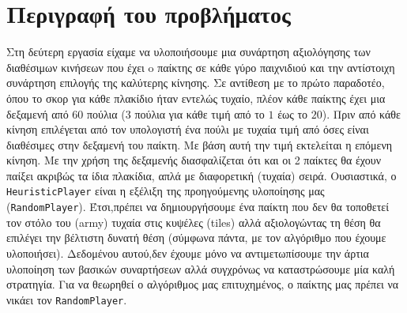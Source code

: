 \chapter{Περιγραφή του προβλήματος}
Στη δεύτερη εργασία είχαμε να υλοποιήσουμε μια συνάρτηση αξιολόγησης των διαθέσιμων
κινήσεων που έχει o παίκτης σε κάθε γύρο παιχνιδιού και την αντίστοιχη συνάρτηση 
επιλογής της καλύτερης κίνησης. 
Σε αντίθεση με το πρώτο παραδοτέο, όπου το σκορ για 
κάθε πλακίδιο ήταν εντελώς τυχαίο, πλέον κάθε παίκτης έχει μια δεξαμενή από $60$ πούλια
(3 πούλια για κάθε τιμή από το $1$ έως το $20$).
Πριν από κάθε κίνηση επιλέγεται από τον υπολογιστή ένα πούλι με τυχαία τιμή από όσες είναι διαθέσιμες στην δεξαμενή του παίκτη.
Με βάση αυτή την τιμή εκτελείται η επόμενη κίνηση.
Με την χρήση της δεξαμενής διασφαλίζεται ότι και οι 2 παίκτες θα έχουν παίξει ακριβώς τα ίδια πλακίδια, απλά με διαφορετική (τυχαία) σειρά.
Ουσιαστικά, ο \lstinline!HeuristicPlayer! είναι η εξέλιξη της 
προηγούμενης υλοποίησης μας (\lstinline!RandomPlayer!).
Έτσι,πρέπει να δημιουργήσουμε ένα παίκτη που δεν θα τοποθετεί τον στόλο του (army) τυχαία στις κυψέλες (tiles)
αλλά αξιολογώντας τη θέση θα επιλέγει την βέλτιστη δυνατή θέση (σύμφωνα πάντα,
με τον αλγόριθμο που έχουμε υλοποιήσει).
Δεδομένου αυτού,δεν έχουμε μόνο να αντιμετωπίσουμε την άρτια υλοποίηση 
των βασικών συναρτήσεων αλλά συγχρόνως  να καταστρώσουμε μία καλή στρατηγία.
Για να θεωρηθεί ο αλγόριθμος μας επιτυχημένος, ο παίκτης μας πρέπει να νικάει τον 
\lstinline!RandomPlayer!.
